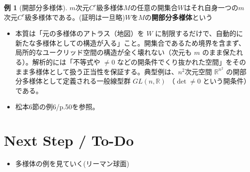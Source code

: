 \documentclass[paper=a4, fontsize=11pt]{jlreq} %
\theoremstyle{definition}
\newtheorem{example}[theorem]{例}
\begin{document}
\begin{example}[開部分多様体]
    $m$次元$C^{r}$級多様体$M$の任意の開集合$W$はそれ自身一つの$m$次元$C^{r}$級多様体である。(証明は一旦略)$W$を$M$の\textbf{開部分多様体}という
    \begin{itemize}
        \item[\textbf{Insight:}] 本質は「元の多様体のアトラス（地図）を $W$ に制限するだけで、自動的に新たな多様体としての構造が入る」こと。開集合であるため境界を含まず、局所的なユークリッド空間の構造が全く壊れない（次元も $m$ のまま保たれる）。解析的には「不等式や $\neq 0$ などの開条件でくり抜かれた空間」をそのまま多様体として扱う正当性を保証する。典型例は、$n^2$次元空間 $\mathbb{R}^{n^2}$ の開部分多様体として定義される一般線型群 $GL(n, \mathbb{R})$ （$\det \neq 0$ という開条件）である。
        \item[\textbf{Link:}] 松本6節の例6/p.50を参照。
    \end{itemize}
\end{example}

\section{Next Step / To-Do}
\begin{itemize}
    \item [ ] 多様体の例を見ていく(リーマン球面)
\end{itemize}
\end{document}
